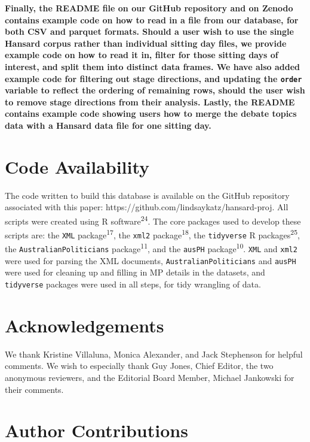 \documentclass[
  letterpaper,
  DIV=11,
  numbers=noendperiod]{scrartcl}
\begin{document}
\textbf{Finally, the README file on our GitHub repository and on Zenodo
contains example code on how to read in a file from our database, for
both CSV and parquet formats. Should a user wish to use the single
Hansard corpus rather than individual sitting day files, we provide
example code on how to read it in, filter for those sitting days of
interest, and split them into distinct data frames. We have also added
example code for filtering out stage directions, and updating the
\texttt{order} variable to reflect the ordering of remaining rows,
should the user wish to remove stage directions from their analysis.
Lastly, the README contains example code showing users how to merge the
debate topics data with a Hansard data file for one sitting day.}

\hypertarget{code-availability}{%
\section{Code Availability}\label{code-availability}}

The code written to build this database is available on the GitHub
repository associated with this paper:
https://github.com/lindsaykatz/hansard-proj. All scripts were created
using R software\textsuperscript{24}. The core packages used to develop
these scripts are: the \texttt{XML} package\textsuperscript{17}, the
\texttt{xml2} package\textsuperscript{18}, the \texttt{tidyverse} R
packages\textsuperscript{25}, the \texttt{AustralianPoliticians}
package\textsuperscript{11}, and the \texttt{ausPH}
package\textsuperscript{10}. \texttt{XML} and \texttt{xml2} were used
for parsing the XML documents, \texttt{AustralianPoliticians} and
\texttt{ausPH} were used for cleaning up and filling in MP details in
the datasets, and \texttt{tidyverse} packages were used in all steps,
for tidy wrangling of data.

\hypertarget{acknowledgements}{%
\section{Acknowledgements}\label{acknowledgements}}

We thank Kristine Villaluna, Monica Alexander, and Jack Stephenson for
helpful comments. We wish to especially thank Guy Jones, Chief Editor,
the two anonymous reviewers, and the Editorial Board Member, Michael
Jankowski for their comments.

\hypertarget{author-contributions}{%
\section{Author Contributions}\label{author-contributions}}
\end{document}
